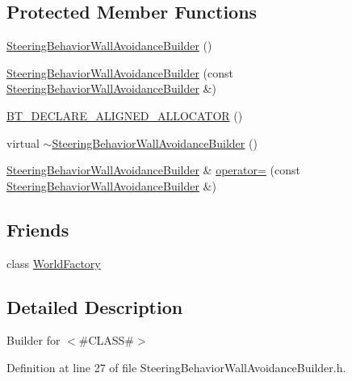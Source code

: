 \subsection*{Protected Member Functions}
\begin{DoxyCompactItemize}
\item 
\mbox{\hyperlink{classnjli_1_1_steering_behavior_wall_avoidance_builder_afd6b4c56b44f74204a8918f9b9d7049d}{Steering\+Behavior\+Wall\+Avoidance\+Builder}} ()
\item 
\mbox{\hyperlink{classnjli_1_1_steering_behavior_wall_avoidance_builder_ad795fcd3aa7a7550cc8891544317737f}{Steering\+Behavior\+Wall\+Avoidance\+Builder}} (const \mbox{\hyperlink{classnjli_1_1_steering_behavior_wall_avoidance_builder}{Steering\+Behavior\+Wall\+Avoidance\+Builder}} \&)
\item 
\mbox{\hyperlink{classnjli_1_1_steering_behavior_wall_avoidance_builder_ada7666070204285c674bc8b854acfe46}{B\+T\+\_\+\+D\+E\+C\+L\+A\+R\+E\+\_\+\+A\+L\+I\+G\+N\+E\+D\+\_\+\+A\+L\+L\+O\+C\+A\+T\+OR}} ()
\item 
virtual \mbox{\hyperlink{classnjli_1_1_steering_behavior_wall_avoidance_builder_ad8b4bebddd0b4b1ece07fd5f825490fe}{$\sim$\+Steering\+Behavior\+Wall\+Avoidance\+Builder}} ()
\item 
\mbox{\hyperlink{classnjli_1_1_steering_behavior_wall_avoidance_builder}{Steering\+Behavior\+Wall\+Avoidance\+Builder}} \& \mbox{\hyperlink{classnjli_1_1_steering_behavior_wall_avoidance_builder_a9191cc6dd8ba06051c04e13cac80283f}{operator=}} (const \mbox{\hyperlink{classnjli_1_1_steering_behavior_wall_avoidance_builder}{Steering\+Behavior\+Wall\+Avoidance\+Builder}} \&)
\end{DoxyCompactItemize}
\subsection*{Friends}
\begin{DoxyCompactItemize}
\item 
class \mbox{\hyperlink{classnjli_1_1_steering_behavior_wall_avoidance_builder_acb96ebb09abe8f2a37a915a842babfac}{World\+Factory}}
\end{DoxyCompactItemize}


\subsection{Detailed Description}
Builder for $<$\#\+C\+L\+A\+SS\#$>$ 

Definition at line 27 of file Steering\+Behavior\+Wall\+Avoidance\+Builder.\+h.




